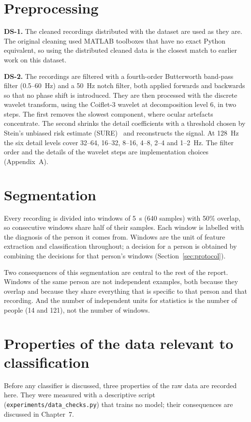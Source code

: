 \section{Preprocessing}
\textbf{DS-1.} The cleaned recordings distributed with the dataset are used as they are. The
original cleaning used MATLAB toolboxes that have no exact Python equivalent, so using the
distributed cleaned data is the closest match to earlier work on this dataset.

\textbf{DS-2.} The recordings are filtered with a fourth-order Butterworth band-pass filter
(0.5--60~Hz) and a 50~Hz notch filter, both applied forwards and backwards so that no phase
shift is introduced. They are then processed with the discrete wavelet transform, using the
Coiflet-3 wavelet at decomposition level 6, in two steps. The first removes the slowest
component, where ocular artefacts concentrate. The second shrinks the detail coefficients with
a threshold chosen by Stein's unbiased risk estimate (SURE)~\cite{donoho1995} and reconstructs
the signal. At 128~Hz the six detail levels cover 32--64, 16--32, 8--16, 4--8, 2--4 and 1--2~Hz.
The filter order and the details of the wavelet steps are implementation choices
(Appendix~A).

\section{Segmentation}
Every recording is divided into windows of 5~s (640 samples) with 50\% overlap, so consecutive
windows share half of their samples. Each window is labelled with the diagnosis of the person
it comes from. Windows are the unit of feature extraction and classification throughout; a
decision for a person is obtained by combining the decisions for that person's windows
(Section~\ref{sec:protocol}).

Two consequences of this segmentation are central to the rest of the report. Windows of the
same person are not independent examples, both because they overlap and because they share
everything that is specific to that person and that recording. And the number of independent
units for statistics is the number of people (14 and 121), not the number of windows.

\section{Properties of the data relevant to classification}
\label{sec:datachecks}
Before any classifier is discussed, three properties of the raw data are recorded here. They
were measured with a descriptive script (\texttt{experiments/data\_checks.py}) that trains no
model; their consequences are discussed in Chapter~7.

